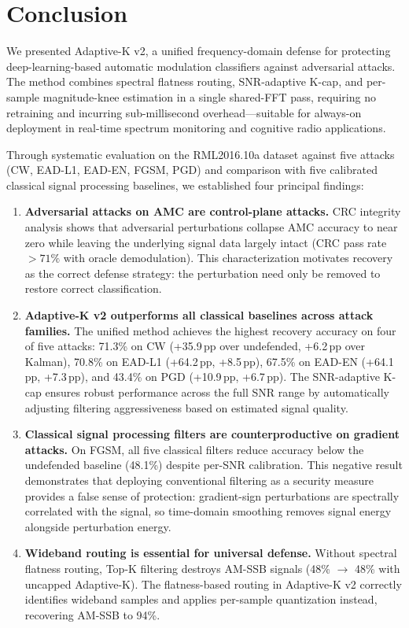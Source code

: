 \section{Conclusion}
\label{sec:conclusion}

We presented Adaptive-K v2, a unified frequency-domain defense for protecting
deep-learning-based automatic modulation classifiers against adversarial attacks.
The method combines spectral flatness routing, SNR-adaptive K-cap, and per-sample
magnitude-knee estimation in a single shared-FFT pass, requiring no retraining
and incurring sub-millisecond overhead---suitable for always-on deployment in
real-time spectrum monitoring and cognitive radio applications.

Through systematic evaluation on the RML2016.10a dataset against five attacks
(CW, EAD-L1, EAD-EN, FGSM, PGD) and comparison with five calibrated classical
signal processing baselines, we established four principal findings:

\begin{enumerate}

\item \textbf{Adversarial attacks on AMC are control-plane attacks.}  CRC
  integrity analysis shows that adversarial perturbations collapse AMC accuracy
  to near zero while leaving the underlying signal data largely intact (CRC pass
  rate $> 71\%$ with oracle demodulation).  This characterization motivates
  recovery as the correct defense strategy: the perturbation need only be
  removed to restore correct classification.

\item \textbf{Adaptive-K v2 outperforms all classical baselines across attack
  families.}  The unified method achieves the highest recovery accuracy on four
  of five attacks: 71.3\% on CW (+35.9\,pp over undefended, +6.2\,pp over
  Kalman), 70.8\% on EAD-L1 (+64.2\,pp, +8.5\,pp), 67.5\% on EAD-EN
  (+64.1\,pp, +7.3\,pp), and 43.4\% on PGD (+10.9\,pp, +6.7\,pp).  The
  SNR-adaptive K-cap ensures robust performance across the full SNR range
  by automatically adjusting filtering aggressiveness based on estimated
  signal quality.

\item \textbf{Classical signal processing filters are counterproductive on
  gradient attacks.}  On FGSM, all five classical filters reduce accuracy
  below the undefended baseline (48.1\%) despite per-SNR calibration.  This
  negative result demonstrates that deploying conventional filtering as a
  security measure provides a false sense of protection: gradient-sign
  perturbations are spectrally correlated with the signal, so time-domain
  smoothing removes signal energy alongside perturbation energy.

\item \textbf{Wideband routing is essential for universal defense.}  Without
  spectral flatness routing, Top-K filtering destroys AM-SSB signals
  (48\% $\to$ 48\% with uncapped Adaptive-K).  The flatness-based routing in
  Adaptive-K v2 correctly identifies wideband samples and applies per-sample
  quantization instead, recovering AM-SSB to 94\%.

\end{enumerate}

